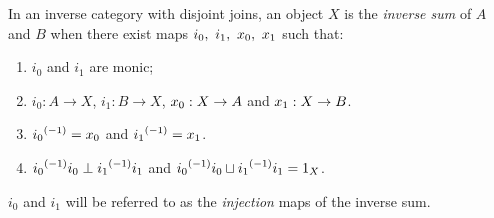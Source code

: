 \begin{definition}\label{def:inverse_sum}
  In an inverse category with disjoint joins, an object $X$ is the \emph{inverse sum} of $A$ and
  $B$ when there exist maps $i_0,\ i_1,\ \xa,\ \xb$ such that:
  \begin{enumerate}[{(}i{)}]
    \item $i_0$ and $i_1$ are monic;
    \item $i_0 : A \to X$, $i_1: B \to X$, $x_0: X \to A$ and $x_1: X \to B$.
    \item ${i_0}^{(-1)} = x_0$ and ${i_1}^{(-1)} = x_1$.
    \item ${i_0}^{(-1)}i_0 \perp {i_1}^{(-1)}i_1$ and ${i_0}^{(-1)}i_0 \sqcup {i_1}^{(-1)}i_1 = 1_X$.
  \end{enumerate}
  $i_0$ and $i_1$ will be referred to as the \emph{injection} maps of the inverse sum.
\end{definition}

